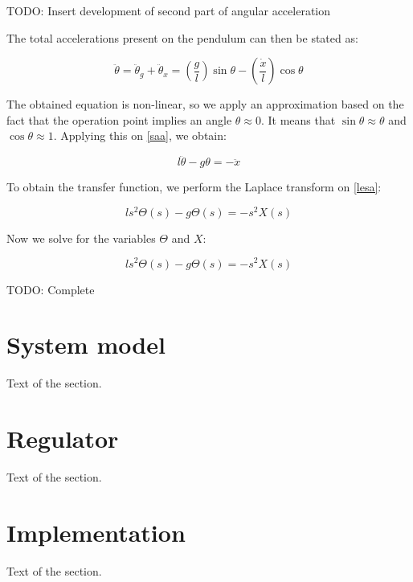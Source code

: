 \documentclass{article}
\begin{document}
TODO: Insert development of second part of angular acceleration

The total accelerations present on the pendulum can then be stated as:

\begin{equation} \label{saa}
	\ddot{\theta}=\ddot{\theta}_g+\ddot{\theta}_x=\left(\frac{g}{l}\right)\sin{\theta}-\left(\frac{\dot{x}}{l}\right)\cos{\theta}
\end{equation}

The obtained equation is non-linear, so we apply an approximation based on the fact that the operation point implies an angle $\theta\approx0$. It means that $\sin{\theta}\approx\theta$ and $\cos{\theta}\approx1$. Applying this on \ref{saa}, we obtain:

\begin{equation} \label{lesa}
	l\ddot{\theta}-g\theta=-\ddot{x}
\end{equation}

To obtain the transfer function, we perform the Laplace transform on \ref{lesa}:

\begin{equation} \label{ltsa}
	ls^2\Theta(s)-g\Theta(s)=-s^2X(s)
\end{equation}

Now we solve for the variables $\Theta$ and $X$:

\begin{equation} \label{tfsa}
	ls^2\Theta(s)-g\Theta(s)=-s^2X(s)
\end{equation}

TODO: Complete

\section{System model}

Text of the section.

\section{Regulator}

Text of the section.

\section{Implementation}

Text of the section.


\begin{appendix}
	\newpage
	\listoffigures
	\newpage
	\listoftables
\end{appendix}

\newpage
\printbibliography
\nocite{*}
\end{document}
